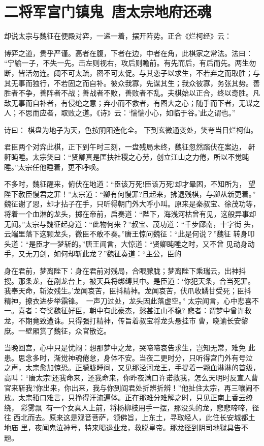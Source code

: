 \chapter{二将军宫门镇鬼~唐太宗地府还魂}

却说太宗与魏征在便殿对弈，一递一着，摆开阵势。正合《烂柯经》云：

博弈之道，贵乎严谨。高者在腹，下者在边，中者在角，此棋家之常法。法曰：
“宁输一子，不失一先。击左则视右，攻后则瞻前。有先而后，有后而先。两生勿
断，皆活勿连。阔不可太疏，密不可太促。与其恋子以求生，不若弃之而取胜；与
其无事而独行，不若固之而自补。彼众我寡，先谋其生；我众彼寡，务张其势。善
胜者不争，善阵者不战；善战者不败，善败者不乱。夫棋始以正合，终以奇胜。凡
敌无事而自补者，有侵绝之意；弃小而不救者，有图大之心；随手而下者，无谋之
人；不思而应者，取败之道。《诗》云：‘惴惴小心，如临于谷。’此之谓也。”

诗曰：
棋盘为地子为天，色按阴阳造化全。
下到玄微通变处，笑夸当日烂柯仙。

君臣两个对弈此棋，正下到午时三刻，一盘残局未终，魏征忽然踏伏在案边，
鼾鼾盹睡。太宗笑曰：“贤卿真是匡扶社稷之心劳，创立江山之力倦，所以不觉盹
睡。”太宗任他睡着，更不呼唤。

不多时，魏征醒来，俯伏在地道：“臣该万死!臣该万死!却才晕困，不知所为，
望陛下赦臣慢君之罪！”太宗道：“卿有何慢罪?且起来，拂退残棋，与卿从新更着。”
魏征谢了恩，却才拈子在手，只听得朝门外大呼小叫。原来是秦叔宝、徐茂功等，
将着一个血淋的龙头，掷在帝前，启奏道：“陛下，海浅河枯曾有见，这般异事却
无闻。”太宗与魏征起身道：“此物何来？”叔宝、茂功道：“千步廊南，十字街
头，云端里落下这颗龙头，微臣不敢不奏。”唐王惊问魏征：“此是何说？”魏征
转身叩头道：“是臣才一梦斩的。”唐王闻言，大惊道：“贤卿盹睡之时，又不曾
见动身动手，又无刀剑，如何却斩此龙？”魏征奏道：“主公，臣的

身在君前，梦离陛下：身在君前对残局，合眼朦胧；梦离陛下乘瑞云，出神抖
搜。那条龙，在剐龙台上，被天兵将绑缚其中。是臣道：‘你犯天条，合当死罪。
我奉天命，斩汝残生。’龙闻哀苦，臣抖精神。龙闻哀苦，伏爪收鳞甘受死；臣抖
精神，撩衣进步举霜锋。一声刀过处，龙头因此落虚空。”
太宗闻言，心中悲喜不一。喜者：夸奖魏征好臣，朝中有此豪杰，愁甚江山不稳?
悲者：谓梦中曾许救龙，不期竟致遭诛。只得强打精神，传旨着叔宝将龙头悬挂市
曹，晓谕长安黎庶。一壁厢赏了魏征，众官散讫。

当晚回宫，心中只是忧闷：想那梦中之龙，哭啼啼哀告求生，岂知无常，难免
此患。思念多时，渐觉神魂倦怠，身体不安。当夜二更时分，只听得宫门外有号泣
之声，太宗愈加惊恐。正朦胧睡间，又见那泾河龙王，手提着一颗血淋淋的首级，
高叫：“唐太宗!还我命来，还我命来，你昨夜满口许诺救我，怎么天明时反宣人曹
官来斩我?你出来，你出来，我与你到阎君处折辨折辨！”他扯住太宗，再三嚷闹不
放。太宗箝口难言，只挣得汗流遍体。正在那难分难解之时，只见正南上香云缭绕，
彩雾飘，有一个女真人上前，将杨柳枝用手一摆，那没头的龙，悲悲啼啼，径往
西北而去。原来这是观音菩萨，领佛旨，上东土，寻取经人，此住长安城都土地庙
里，夜闻鬼泣神号，特来喝退业龙，救脱皇帝。那龙径到阴司地狱具告不题。


